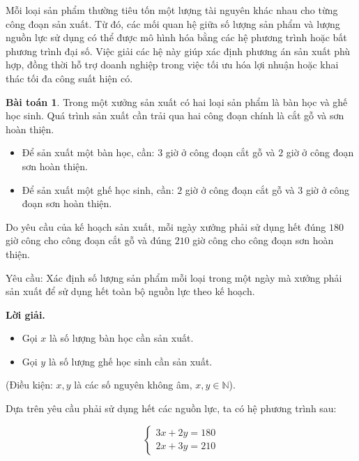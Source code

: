 \documentclass[12pt,a4paper,oneside]{book}
\theoremstyle{theorem}
\theoremstyle{definition}
\newtheorem{bt}[theorem2]{Bài toán}
\begin{document}
Mỗi loại sản phẩm thường tiêu tốn một lượng tài nguyên khác nhau cho từng
công đoạn sản xuất. Từ đó, các mối quan hệ giữa số lượng sản phẩm và lượng
nguồn lực sử dụng có thể được mô hình hóa bằng các hệ phương trình hoặc bất
phương trình đại số. Việc giải các hệ này giúp xác định phương án sản xuất phù
hợp, đồng thời hỗ trợ doanh nghiệp trong việc tối ưu hóa lợi nhuận hoặc khai
thác tối đa công suất hiện có.
\begin{bt}
Trong một xưởng sản xuất có hai loại sản phẩm là bàn học và ghế học sinh.
Quá trình sản xuất cần trải qua hai công đoạn chính là cắt gỗ và sơn hoàn thiện.

\begin{itemize}
    \item Để sản xuất một bàn học, cần: \(3\) giờ ở công đoạn cắt gỗ và \(2\) giờ ở
    công đoạn sơn hoàn thiện.

    \item Để sản xuất một ghế học sinh, cần: \(2\) giờ ở công đoạn cắt gỗ và \(3\) giờ
    ở công đoạn sơn hoàn thiện.
\end{itemize}

Do yêu cầu của kế hoạch sản xuất, mỗi ngày xưởng phải sử dụng hết đúng
\(180\) giờ công cho công đoạn cắt gỗ và đúng \(210\) giờ công cho công đoạn
sơn hoàn thiện.

\medskip

Yêu cầu: Xác định số lượng sản phẩm mỗi loại trong một ngày mà xưởng
phải sản xuất để sử dụng hết toàn bộ nguồn lực theo kế hoạch.

\bigskip

\textbf{Lời giải.}

\medskip

\begin{itemize}
    \item Gọi \(x\) là số lượng bàn học cần sản xuất.

    \item Gọi \(y\) là số lượng ghế học sinh cần sản xuất.
\end{itemize}

(Điều kiện: \(x,y\) là các số nguyên không âm, \(x,y\in\mathbb{N}\)).

\medskip

Dựa trên yêu cầu phải sử dụng hết các nguồn lực, ta có hệ phương trình sau:

\[
\begin{cases}
3x+2y=180\\
2x+3y=210
\end{cases}
\]


\end{bt}
\end{document}
